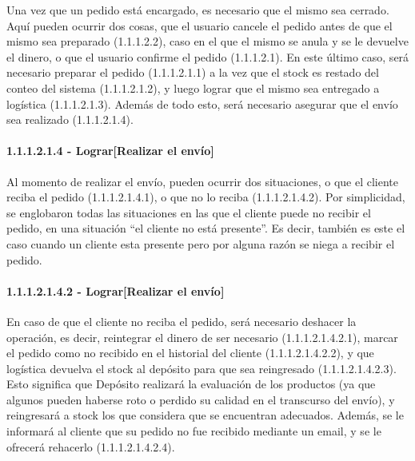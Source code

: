 Una vez que un pedido está encargado, es necesario que el mismo sea cerrado.
Aquí pueden ocurrir dos cosas, que el usuario cancele el pedido antes de que el
mismo sea preparado (1.1.1.2.2), caso en el que el mismo se anula y se le
devuelve el dinero, o que el usuario confirme el pedido (1.1.1.2.1). En este
último caso, será necesario preparar el pedido (1.1.1.2.1.1) a la vez que el
stock es restado del conteo del sistema (1.1.1.2.1.2), y luego lograr que el
mismo sea entregado a logística (1.1.1.2.1.3). Además de todo esto, será
necesario asegurar que el envío sea realizado (1.1.1.2.1.4).

\paragraph{1.1.1.2.1.4 - Lograr[Realizar el envío]}

Al momento de realizar el envío, pueden ocurrir dos situaciones, o que el
cliente reciba el pedido (1.1.1.2.1.4.1), o que no lo reciba (1.1.1.2.1.4.2).
Por simplicidad, se englobaron todas las situaciones en las que el cliente puede
no recibir el pedido, en una situación ``el cliente no está presente''. Es
decir, también es este el caso cuando un cliente esta presente pero por alguna
razón se niega a recibir el pedido.

\paragraph{1.1.1.2.1.4.2 - Lograr[Realizar el envío]}

En caso de que el cliente no reciba el pedido, será necesario deshacer la
operación, es decir, reintegrar el dinero de ser necesario (1.1.1.2.1.4.2.1),
marcar el pedido como no recibido en el historial del cliente (1.1.1.2.1.4.2.2),
y que logística devuelva el stock al depósito para que sea reingresado
(1.1.1.2.1.4.2.3). Esto significa que Depósito realizará la evaluación de los
productos (ya que algunos pueden haberse roto o perdido su calidad en el
transcurso del envío), y reingresará a stock los que considera que se encuentran
adecuados. Además, se le informará al cliente que su pedido no fue recibido
mediante un email, y se le ofrecerá rehacerlo (1.1.1.2.1.4.2.4).

